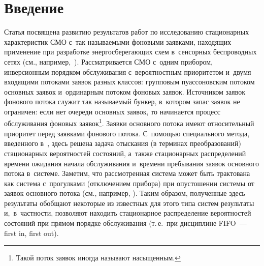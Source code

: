 
 



\thispagestyle{headings}

\begin{multicols}{2}

\label{st\stat}

\section{Введение}

Статья посвящена развитию результатов работ \cite{R6,new1,R3,R4}
по исследованию стационарных харак\-те\-ри\-стик %
СМО с~так называемыми фоновыми заявками, находящих применение при 
разработке энерго\-сбе\-ре\-га\-ющих схем в~сенсорных беспроводных \mbox{сетях}
(см., например,~\cite{R9}). Рассматривается СМО с~одним прибором, 
инверсионным порядком обслуживания с~вероятностным приоритетом 
и~двумя входящими потоками заявок разных классов: групповым 
пуассоновским потоком основных заявок и~ординарным потоком фоновых 
заявок. Источником заявок фонового потока служит так называемый бункер, 
в~котором запас заявок не ограничен: если нет очереди основных заявок, 
то начинается процесс обслуживания фоновых  заявок\footnote[3]{Такой 
поток заявок иногда называют насыщенным.}.
Заявки основного потока имеют относительный приоритет перед заявками 
фонового потока. С~помощью специального метода, введенного в~\cite{n4}, 
здесь решена задача отыскания (в терминах преобразований) стационарных 
вероятностей состояний, \mbox{а~также} стационарных распределений времени 
ожидания начала обслуживания и~времени пребывания заявок основного 
потока в~системе. Заметим, что рассмотренная система может быть трактована 
как система с~прогулками (отключением прибора) при опустошении системы 
от заявок основного потока (см., например, \cite{R5,R7}). Таким образом, 
полученные здесь результаты обобщают некоторые из известных для этого 
типа систем результаты и,~в~частности, позволяют находить стационарное 
распределение вероятностей состояний при прямом порядке обслуживания 
(т.\,е.\ при дисциплине FIFO~--- first in, first out).

\vspace*{-9pt}


\end{multicols}
